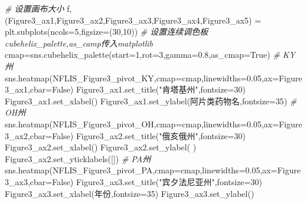 \documentclass[
]{article}
\newenvironment{Shaded}{}{}
\newcommand{\CommentTok}[1]{\textcolor[rgb]{0.38,0.63,0.69}{\textit{#1}}}
\newcommand{\DecValTok}[1]{\textcolor[rgb]{0.25,0.63,0.44}{#1}}
\newcommand{\FloatTok}[1]{\textcolor[rgb]{0.25,0.63,0.44}{#1}}
\newcommand{\NormalTok}[1]{#1}
\newcommand{\OperatorTok}[1]{\textcolor[rgb]{0.40,0.40,0.40}{#1}}
\newcommand{\StringTok}[1]{\textcolor[rgb]{0.25,0.44,0.63}{#1}}
\newcommand{\VariableTok}[1]{\textcolor[rgb]{0.10,0.09,0.49}{#1}}
\begin{document}
\begin{Shaded}
\begin{Highlighting}[]
\CommentTok{\# 设置画布大小}
\NormalTok{f,(Figure3\_ax1,Figure3\_ax2,Figure3\_ax3,Figure3\_ax4,Figure3\_ax5) }\OperatorTok{=}\NormalTok{ plt.subplots(ncols}\OperatorTok{=}\DecValTok{5}\NormalTok{,figsize}\OperatorTok{=}\NormalTok{(}\DecValTok{30}\NormalTok{,}\DecValTok{10}\NormalTok{))}
\CommentTok{\# 设置连续调色板cubehelix\_palette,as\_camp传入matplotlib}
\NormalTok{cmap}\OperatorTok{=}\NormalTok{sns.cubehelix\_palette(start}\OperatorTok{=}\DecValTok{1}\NormalTok{,rot}\OperatorTok{=}\DecValTok{3}\NormalTok{,gamma}\OperatorTok{=}\FloatTok{0.8}\NormalTok{,as\_cmap}\OperatorTok{=}\VariableTok{True}\NormalTok{)}
\CommentTok{\# KY州}
\NormalTok{sns.heatmap(NFLIS\_Figure3\_pivot\_KY,cmap}\OperatorTok{=}\NormalTok{cmap,linewidths}\OperatorTok{=}\FloatTok{0.05}\NormalTok{,ax}\OperatorTok{=}\NormalTok{Figure3\_ax1,cbar}\OperatorTok{=}\VariableTok{False}\NormalTok{)}
\NormalTok{Figure3\_ax1.set\_title(}\StringTok{"肯塔基州"}\NormalTok{,fontsize}\OperatorTok{=}\DecValTok{30}\NormalTok{)}
\NormalTok{Figure3\_ax1.set\_xlabel(}\StringTok{\textquotesingle{}\textquotesingle{}}\NormalTok{)}
\NormalTok{Figure3\_ax1.set\_ylabel(}\StringTok{\textquotesingle{}阿片类药物名\textquotesingle{}}\NormalTok{,fontsize}\OperatorTok{=}\DecValTok{35}\NormalTok{)}
\CommentTok{\# OH州}
\NormalTok{sns.heatmap(NFLIS\_Figure3\_pivot\_OH,cmap}\OperatorTok{=}\NormalTok{cmap,linewidths}\OperatorTok{=}\FloatTok{0.05}\NormalTok{,ax}\OperatorTok{=}\NormalTok{Figure3\_ax2,cbar}\OperatorTok{=}\VariableTok{False}\NormalTok{)}
\NormalTok{Figure3\_ax2.set\_title(}\StringTok{"俄亥俄州"}\NormalTok{,fontsize}\OperatorTok{=}\DecValTok{30}\NormalTok{)}
\NormalTok{Figure3\_ax2.set\_xlabel(}\StringTok{\textquotesingle{}\textquotesingle{}}\NormalTok{)}
\NormalTok{Figure3\_ax2.set\_ylabel(}\StringTok{\textquotesingle{} \textquotesingle{}}\NormalTok{)}
\NormalTok{Figure3\_ax2.set\_yticklabels([])}
\CommentTok{\# PA州}
\NormalTok{sns.heatmap(NFLIS\_Figure3\_pivot\_PA,cmap}\OperatorTok{=}\NormalTok{cmap,linewidths}\OperatorTok{=}\FloatTok{0.05}\NormalTok{,ax}\OperatorTok{=}\NormalTok{Figure3\_ax3,cbar}\OperatorTok{=}\VariableTok{False}\NormalTok{)}
\NormalTok{Figure3\_ax3.set\_title(}\StringTok{"宾夕法尼亚州"}\NormalTok{,fontsize}\OperatorTok{=}\DecValTok{30}\NormalTok{)}
\NormalTok{Figure3\_ax3.set\_xlabel(}\StringTok{\textquotesingle{}年份\textquotesingle{}}\NormalTok{,fontsize}\OperatorTok{=}\DecValTok{35}\NormalTok{)}
\NormalTok{Figure3\_ax3.set\_ylabel(}\StringTok{\textquotesingle{}\textquotesingle{}}\NormalTok{)}

\end{Highlighting}
\end{Shaded}
\end{document}
